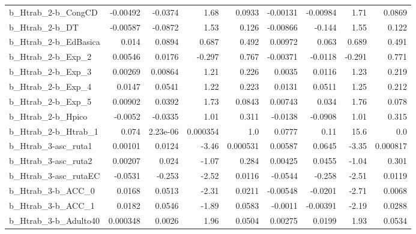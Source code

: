 \begin{tabular}{lrrrrrrrr}
b\_Htrab\_2-b\_CongCD         &    -0.00492 &      -0.0374 &      1.68 &   0.0933 &   -0.00131 &    -0.00984 &         1.71 &        0.0869 \\
b\_Htrab\_2-b\_DT             &    -0.00587 &      -0.0872 &      1.53 &    0.126 &   -0.00866 &      -0.144 &         1.55 &         0.122 \\
b\_Htrab\_2-b\_EdBasica       &       0.014 &       0.0894 &     0.687 &    0.492 &    0.00972 &       0.063 &        0.689 &         0.491 \\
b\_Htrab\_2-b\_Exp\_2          &     0.00546 &       0.0176 &    -0.297 &    0.767 &   -0.00371 &     -0.0118 &       -0.291 &         0.771 \\
b\_Htrab\_2-b\_Exp\_3          &     0.00269 &      0.00864 &      1.21 &    0.226 &     0.0035 &      0.0116 &         1.23 &         0.219 \\
b\_Htrab\_2-b\_Exp\_4          &      0.0147 &       0.0541 &      1.22 &    0.223 &     0.0131 &      0.0511 &         1.25 &         0.212 \\
b\_Htrab\_2-b\_Exp\_5          &     0.00902 &       0.0392 &      1.73 &   0.0843 &    0.00743 &       0.034 &         1.76 &         0.078 \\
b\_Htrab\_2-b\_Hpico          &     -0.0052 &      -0.0335 &      1.01 &    0.311 &    -0.0138 &     -0.0908 &         1.01 &         0.315 \\
b\_Htrab\_2-b\_Htrab\_1        &       0.074 &     2.23e-06 &  0.000354 &      1.0 &     0.0777 &        0.11 &         15.6 &           0.0 \\
b\_Htrab\_3-asc\_ruta1        &     0.00101 &       0.0124 &     -3.46 & 0.000531 &    0.00587 &      0.0645 &        -3.35 &      0.000817 \\
b\_Htrab\_3-asc\_ruta2        &     0.00207 &        0.024 &     -1.07 &    0.284 &    0.00425 &      0.0455 &        -1.04 &         0.301 \\
b\_Htrab\_3-asc\_rutaEC       &     -0.0531 &       -0.253 &     -2.52 &   0.0116 &    -0.0544 &      -0.258 &        -2.51 &        0.0119 \\
b\_Htrab\_3-b\_ACC\_0          &      0.0168 &       0.0513 &     -2.31 &   0.0211 &   -0.00548 &     -0.0201 &        -2.71 &        0.0068 \\
b\_Htrab\_3-b\_ACC\_1          &      0.0182 &       0.0546 &     -1.89 &   0.0583 &    -0.0011 &    -0.00391 &        -2.19 &        0.0288 \\
b\_Htrab\_3-b\_Adulto40       &    0.000348 &       0.0026 &      1.96 &   0.0504 &    0.00275 &      0.0199 &         1.93 &        0.0534 \\

\end{tabular}
